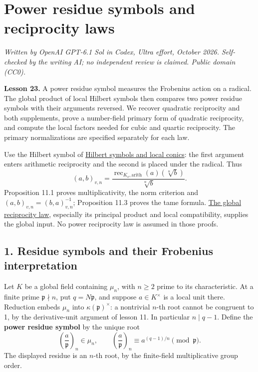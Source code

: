 \documentclass[11pt,a4paper]{article}
\begin{document}
\section{Power residue symbols and reciprocity
laws}\label{power-residue-symbols-and-reciprocity-laws}

\emph{Written by OpenAI GPT-6.1 Sol in Codex, Ultra effort, October
2026. Self-checked by the writing AI; no independent review is claimed.
Public domain (CC0).}

\textbf{Lesson 23.} A power residue symbol measures the Frobenius action
on a radical. The global product of local Hilbert symbols then compares
two power residue symbols with their arguments reversed. We recover
quadratic reciprocity and both supplements, prove a number-field primary
form of quadratic reciprocity, and compute the local factors needed for
cubic and quartic reciprocity. The primary normalizations are specified
separately for each law.

Use the Hilbert symbol of
\href{../hilbert-symbols-and-local-conics.html}{Hilbert symbols and
local conics}: the first argument enters arithmetic reciprocity and the
second is placed under the radical. Thus \[
(a,b)_{v,n}=\frac{\operatorname{rec}_{K_v,\mathrm{arith}}(a)(\sqrt[n]b)}{\sqrt[n]b}.
\tag{1}
\] Proposition 11.1 proves multiplicativity, the norm criterion and
\((a,b)_{v,n}=(b,a)_{v,n}^{-1}\); Proposition 11.3 proves the tame
formula. \href{../the-global-reciprocity-law.html}{The global
reciprocity law}, especially its principal product and local
compatibility, supplies the global input. No power reciprocity law is
assumed in those proofs.

\subsection{1. Residue symbols and their Frobenius
interpretation}\label{residue-symbols-and-their-frobenius-interpretation}

Let \(K\) be a global field containing \(\mu_n\), with \(n\geq2\) prime
to its characteristic. At a finite prime \(\mathfrak p\nmid n\), put
\(q=N\mathfrak p\), and suppose \(a\in K^\times\) is a local unit there.
Reduction embeds \(\mu_n\) into \(\kappa(\mathfrak p)^\times\): a
nontrivial \(n\)-th root cannot be congruent to 1, by the
derivative-unit argument of lesson 11. In particular \(n\mid q-1\).
Define the \textbf{power residue symbol} by the unique root \[
\left(\frac a{\mathfrak p}\right)_n\in\mu_n,
\qquad
\left(\frac a{\mathfrak p}\right)_n\equiv a^{(q-1)/n}\pmod{\mathfrak p}.
\tag{2}
\] The displayed residue is an \(n\)-th root, by the finite-field
multiplicative group order.
\end{document}
